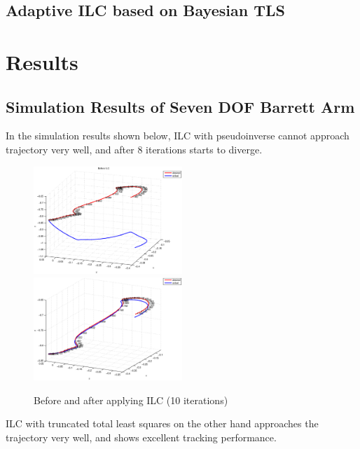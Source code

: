 \documentclass[10pt,a4paper]{article}
\begin{document}
\subsection{Adaptive ILC based on Bayesian TLS}\label{adaptiveILC}
%


\section{Results}\label{results}

%
\subsection{Simulation Results of Seven DOF Barrett Arm}
%
In the simulation results shown below, ILC with pseudoinverse cannot approach trajectory very well, and after 8 iterations starts to diverge.
\begin{figure}
\centering
\includegraphics[width=0.5\textwidth]{beforeILC.eps}%
\includegraphics[width=0.5\textwidth]{afterILCPseudoInv.eps}		
\caption{Before and after applying ILC (10 iterations)}
\end{figure}
%
ILC with truncated total least squares on the other hand approaches the trajectory very well, and shows excellent tracking performance.
%
\end{document}
